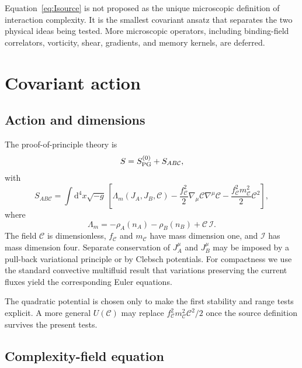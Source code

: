 \documentclass[11pt]{article}
\newcommand{\dd}{\mathrm{d}}
\begin{document}
Equation~\eqref{eq:Isource} is not proposed as the unique microscopic definition of interaction complexity.  It is the smallest covariant ansatz that separates the two physical ideas being tested.  More microscopic operators, including binding-field correlators, vorticity, shear, gradients, and memory kernels, are deferred.

\section{Covariant action}

\subsection{Action and dimensions}

The proof-of-principle theory is
\begin{equation}
S=S_{\rm PG}^{(0)}+S_{AB\mathcal C},
\label{eq:Stotal}
\end{equation}
with
\begin{equation}
S_{AB\mathcal C}
=\int \dd^4x\sqrt{-g}\,
\left[
\Lambda_m(J_A,J_B,\mathcal C)
-\frac{f_{\mathcal C}^2}{2}\nabla_\mu\mathcal C\nabla^\mu\mathcal C
-\frac{f_{\mathcal C}^2m_{\mathcal C}^2}{2}\mathcal C^2
\right],
\label{eq:SABC}
\end{equation}
where
\begin{equation}
\Lambda_m
=-\rho_A(n_A)-\rho_B(n_B)+\mathcal C\,\mathcal I.
\label{eq:masterfunction}
\end{equation}
The field $\mathcal C$ is dimensionless, $f_{\mathcal C}$ and $m_{\mathcal C}$ have mass dimension one, and $\mathcal I$ has mass dimension four.  Separate conservation of $J_A^\mu$ and $J_B^\mu$ may be imposed by a pull-back variational principle or by Clebsch potentials.  For compactness we use the standard convective multifluid result that variations preserving the current fluxes yield the corresponding Euler equations.

The quadratic potential is chosen only to make the first stability and range tests explicit.  A more general $U(\mathcal C)$ may replace $f_{\mathcal C}^2m_{\mathcal C}^2\mathcal C^2/2$ once the source definition survives the present tests.

\subsection{Complexity-field equation}
\end{document}
